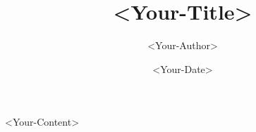 \documentclass{article}
\title{<Your-Title>}
\author{<Your-Author>}
\date{<Your-Date>}
\begin{document}

\setlength\parindent{0pt}

\Large

<Your-Content>
\end{document}
